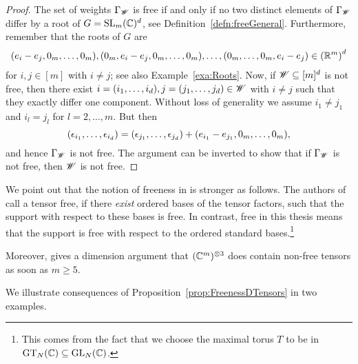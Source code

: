 \begin{proof}
	The set of weights $\Gamma_{\mathscr{W}}$ is free if and only if no two distinct elements of $\Gamma_{\mathscr{W}}$ differ by a root of $G = \operatorname{SL}_m(\mathbb C)^d$, see Definition~\ref{defn:freeGeneral}. Furthermore, remember that the roots of $G$ are
	\begin{align*}
		(e_i - e_j, 0_m, \ldots, 0_m), (0_m, e_i - e_j, 0_m, \ldots, 0_m), \ldots, (0_m, \ldots, 0_m, e_i - e_j) \in \left( \mathbb R^m \right)^d
	\end{align*}
	for $i,j \in [m]$ with $i \neq j$; see also Example~\ref{exa:Roots}. Now, if $\mathscr{W} \subseteq [m]^d$ is not free, then there exist $i = (i_1, \ldots, i_d), j = (j_1, \ldots, j_d) \in \mathscr{W}$ with $i \neq j$ such that they exactly differ one component. Without loss of generality we assume $i_1 \neq j_1$ and $i_l = j_l$ for $l=2,\ldots,m$. But then
	\[ (\epsilon_{i_1}, \ldots, \epsilon_{i_d}) = (\epsilon_{j_1}, \ldots, \epsilon_{j_d}) + (e_{i_1} - e_{j_1}, 0_m, \ldots, 0_m),\]
	and hence $\Gamma_{\mathscr{W}}$ is not free. The argument can be inverted to show that if $\Gamma_{\mathscr{W}}$ is not free, then $\mathscr{W}$ is not free.
\end{proof}

\begin{remark}\label{rem:NonFreeTensors}
	We point out that the notion of freeness in \cite{CVZ} is stronger as follows. The authors of \cite{CVZ} call a tensor free, if there \emph{exist} ordered bases of the tensor factors, such that the support with respect to these bases is free. In contrast, free in this thesis means that the support is free with respect to the ordered standard bases.\footnote{This comes from the fact that we choose the maximal torus $T$ to be in $\operatorname{GT}_N(\mathbb C)\subseteq \operatorname{GL}_N(\mathbb C)$.}
	
	Moreover, \cite[Remark~4.17]{CVZ} gives a dimension argument that $(\mathbb C^m)^{\otimes 3}$ does contain non-free tensors as soon as $m \geq 5$.
	\hfill\remSymbol
\end{remark}

We illustrate consequences of Proposition~\ref{prop:FreenessDTensors} in two examples.

